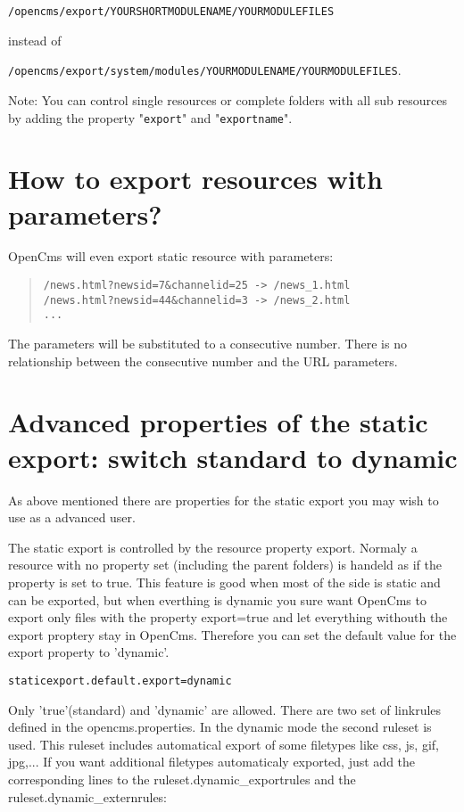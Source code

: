 \texttt{/opencms/export/YOURSHORTMODULENAME/YOURMODULEFILES}

instead of

\texttt{/opencms/export/system/modules/YOURMODULENAME/YOURMODULEFILES}.

Note: You can control single resources or complete folders with all sub resources by adding the property "\texttt{export}" and "\texttt{exportname}".

\section{How to export resources with parameters?}

OpenCms will even export static resource with parameters:

\begin{quote}
\begin{verbatim}
/news.html?newsid=7&channelid=25 -> /news_1.html
/news.html?newsid=44&channelid=3 -> /news_2.html
...
\end{verbatim}
\end{quote}

The parameters will be substituted to a consecutive number. There is no relationship between the consecutive number and the URL parameters.

\section{Advanced properties of the static export: switch standard to dynamic}

As above mentioned there are properties for the static export you may wish to use as a advanced user. 

The static export is controlled by the resource property export. Normaly a resource with no property set (including the parent folders) is handeld as if the property is set to true. This feature is good when most of the side is static and can be exported, but when everthing is dynamic you sure want OpenCms to export only files with the property export=true and let everything withouth the export proptery stay in OpenCms. Therefore you can set the default value for the export property to 'dynamic'.

\texttt{staticexport.default.export=dynamic}

Only 'true'(standard) and 'dynamic' are allowed. There are two set of linkrules defined in the opencms.properties. In the dynamic mode the second ruleset is used. This ruleset includes automatical export of some filetypes like css, js, gif, jpg,... If you want additional filetypes automaticaly exported, just add the corresponding lines to the ruleset.dynamic\_exportrules and the ruleset.dynamic\_externrules:

